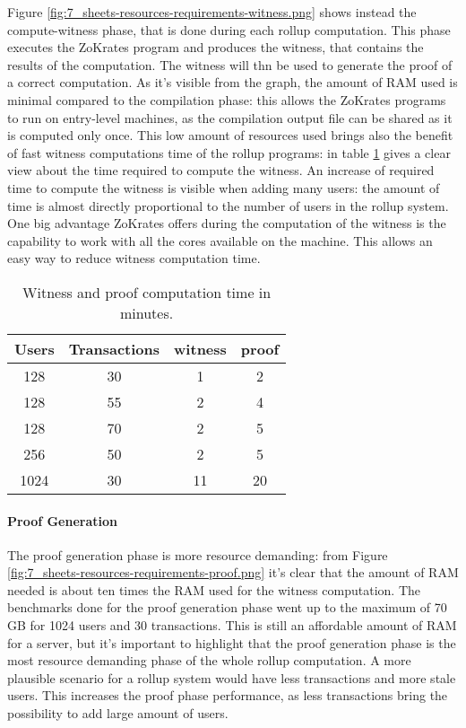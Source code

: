 Figure \ref{fig:7_sheets-resources-requirements-witness.png} shows instead the compute-witness phase, that is done during each rollup computation. This phase executes the ZoKrates program and produces the witness, that contains the results of the computation. The witness will thn be used to generate the proof of a correct computation. As it's visible from the graph, the amount of RAM used is minimal compared to the compilation phase: this allows the ZoKrates programs to run on entry-level machines, as the compilation output file can be shared as it is computed only once. This low amount of resources used brings also the benefit of fast witness computations time of the rollup programs: in table \ref{tab:6_witness-proof-time} gives a clear view about the time required to compute the witness. An increase of required time to compute the witness is visible when adding many users: the amount of time is almost directly proportional to the number of users in the rollup system. One big advantage ZoKrates offers during the computation of the witness is the capability to work with all the cores available on the machine. This allows an easy way to reduce witness computation time.

\begin{table}
	\centering
	\begin{tabular}{|c|c|c|c|}
		\hline
		Users & Transactions & witness & proof \\ \hline
		128   & 30           & 1       & 2     \\ \hline
		128   & 55           & 2       & 4     \\ \hline
		128   & 70           & 2       & 5     \\ \hline
		256   & 50           & 2       & 5     \\ \hline
		1024  & 30           & 11      & 20    \\ \hline
	\end{tabular}
	\caption[Witness Proof time]{Witness and proof computation time in minutes.}
	\label{tab:6_witness-proof-time}
\end{table}

\paragraph{Proof Generation}

The proof generation phase is more resource demanding: from Figure \ref{fig:7_sheets-resources-requirements-proof.png} it's clear that the amount of RAM needed is about ten times the RAM used for the witness computation. The benchmarks done for the proof generation phase went up to the maximum of 70 GB for 1024 users and 30 transactions. This is still an affordable amount of RAM for a server, but it's important to highlight that the proof generation phase is the most resource demanding phase of the whole rollup computation. A more plausible scenario for a rollup system would have less transactions and more stale users. This increases the proof phase performance, as less transactions bring the possibility to add large amount of users.

